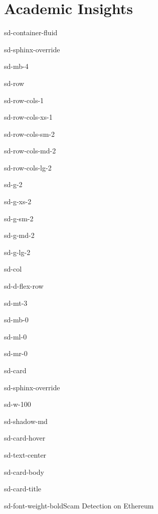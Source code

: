 \documentclass[letterpaper,10pt,english]{jupyterBook}
\begin{document}
\chapter{Academic Insights}
\label{\detokenize{STRUCTURE/academic_2:academic-insights}}\label{\detokenize{STRUCTURE/academic_2::doc}}
\begin{sphinxuseclass}{sd-container-fluid}
\begin{sphinxuseclass}{sd-sphinx-override}
\begin{sphinxuseclass}{sd-mb-4}
\begin{sphinxuseclass}{sd-row}
\begin{sphinxuseclass}{sd-row-cols-1}
\begin{sphinxuseclass}{sd-row-cols-xs-1}
\begin{sphinxuseclass}{sd-row-cols-sm-2}
\begin{sphinxuseclass}{sd-row-cols-md-2}
\begin{sphinxuseclass}{sd-row-cols-lg-2}
\begin{sphinxuseclass}{sd-g-2}
\begin{sphinxuseclass}{sd-g-xs-2}
\begin{sphinxuseclass}{sd-g-sm-2}
\begin{sphinxuseclass}{sd-g-md-2}
\begin{sphinxuseclass}{sd-g-lg-2}
\begin{sphinxuseclass}{sd-col}
\begin{sphinxuseclass}{sd-d-flex-row}
\begin{sphinxuseclass}{sd-mt-3}
\begin{sphinxuseclass}{sd-mb-0}
\begin{sphinxuseclass}{sd-ml-0}
\begin{sphinxuseclass}{sd-mr-0}
\begin{sphinxuseclass}{sd-card}
\begin{sphinxuseclass}{sd-sphinx-override}
\begin{sphinxuseclass}{sd-w-100}
\begin{sphinxuseclass}{sd-shadow-md}
\begin{sphinxuseclass}{sd-card-hover}
\begin{sphinxuseclass}{sd-text-center}
\begin{sphinxuseclass}{sd-card-body}
\begin{sphinxuseclass}{sd-card-title}
\begin{sphinxuseclass}{sd-font-weight-bold}Scam Detection on Ethereum
\end{sphinxuseclass}
\end{sphinxuseclass}



\end{sphinxuseclass}
\end{sphinxuseclass}
\end{sphinxuseclass}
\end{sphinxuseclass}
\end{sphinxuseclass}
\end{sphinxuseclass}
\end{sphinxuseclass}
\end{sphinxuseclass}
\end{sphinxuseclass}
\end{sphinxuseclass}
\end{sphinxuseclass}
\end{sphinxuseclass}
\end{sphinxuseclass}
\end{sphinxuseclass}
\end{sphinxuseclass}
\end{sphinxuseclass}
\end{sphinxuseclass}
\end{sphinxuseclass}
\end{sphinxuseclass}
\end{sphinxuseclass}
\end{sphinxuseclass}
\end{sphinxuseclass}
\end{sphinxuseclass}
\end{sphinxuseclass}
\end{sphinxuseclass}
\end{sphinxuseclass}
\end{sphinxuseclass}
\end{document}
